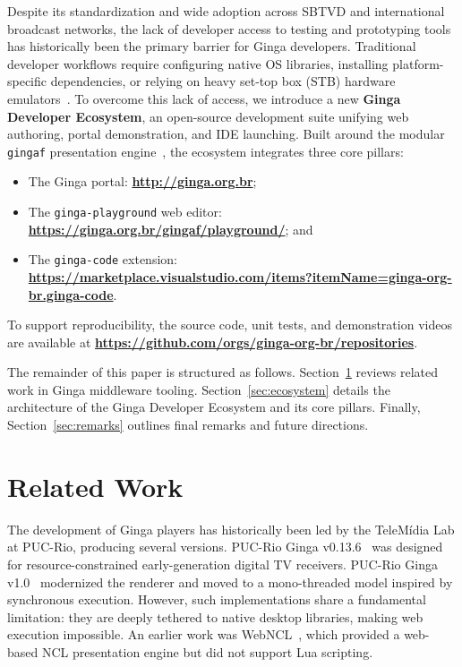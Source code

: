 \documentclass[sigconf,authorversion,review,authordraft]{webmedia}
\begin{document}
Despite its standardization and wide adoption across SBTVD and international broadcast networks, the lack of developer access to testing and prototyping tools has historically been the primary barrier for Ginga developers. Traditional developer workflows require configuring native OS libraries, installing platform-specific dependencies, or relying on heavy set-top box (STB) hardware emulators~\cite{lima2018ginga, moreno2010conciliando}. To overcome this lack of access, we introduce a new \textbf{Ginga Developer Ecosystem}, an open-source development suite unifying web authoring, portal demonstration, and IDE launching. Built around the modular \texttt{gingaf} presentation engine~\cite{gingaf2026}, the ecosystem integrates three core pillars:

\begin{itemize}[leftmargin=*]
  \item The Ginga portal: \textbf{\url{http://ginga.org.br}};
  \item The \texttt{ginga-playground} web editor:\\ \textbf{\url{https://ginga.org.br/gingaf/playground/}}; and
  \item The \texttt{ginga-code} extension:\\ \textbf{\url{https://marketplace.visualstudio.com/items?itemName=ginga-org-br.ginga-code}}.
\end{itemize}

To support reproducibility, the source code, unit tests, and demonstration videos are available at \textbf{\url{https://github.com/orgs/ginga-org-br/repositories}}.

The remainder of this paper is structured as follows. Section~\ref{sec:related} reviews related work in Ginga middleware tooling. Section~\ref{sec:ecosystem} details the architecture of the Ginga Developer Ecosystem and its core pillars. Finally, Section~\ref{sec:remarks} outlines final remarks and future directions.

\section{Related Work}
\label{sec:related}

The development of Ginga players has historically been led by the TeleMídia Lab at PUC-Rio, producing several versions. PUC-Rio Ginga v0.13.6~\cite{ginga2013,moreno2010conciliando} was designed for resource-constrained early-generation digital TV receivers. PUC-Rio Ginga v1.0~\cite{ginga2018,dodsworth2018dynamic} modernized the renderer and moved to a mono-threaded model inspired by synchronous execution. However, such implementations share a fundamental limitation: they are deeply tethered to native desktop libraries, making web execution impossible. An earlier work was WebNCL~\cite{webncl2013}, which provided a web-based NCL presentation engine but did not support Lua scripting.
\end{document}
